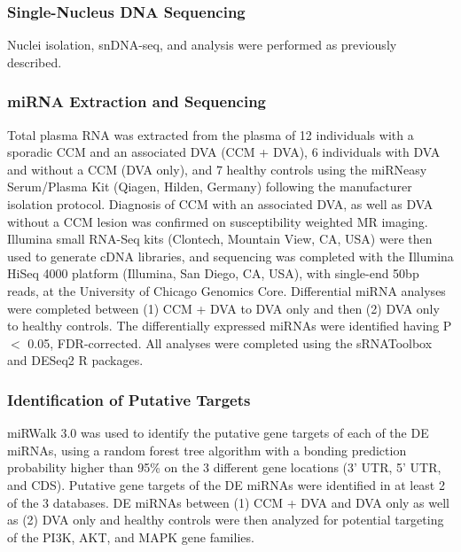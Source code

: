 \subsubsection{Single-Nucleus DNA Sequencing}
Nuclei isolation, snDNA-seq, and analysis were performed as previously described\citep{ren2021}. 

\subsubsection{miRNA Extraction and Sequencing}
Total plasma RNA was extracted from the plasma of 12 individuals with a sporadic CCM and an associated DVA (CCM + DVA), 6 individuals with DVA and without a CCM (DVA only), and 7 healthy controls using the miRNeasy Serum/Plasma Kit (Qiagen, Hilden, Germany) following the manufacturer isolation protocol. Diagnosis of CCM with an associated DVA, as well as DVA without a CCM lesion was confirmed on susceptibility weighted MR imaging. Illumina small RNA-Seq kits (Clontech, Mountain View, CA, USA) were then used to generate cDNA libraries, and sequencing was completed with the Illumina HiSeq 4000 platform (Illumina, San Diego, CA, USA), with single-end 50bp reads, at the University of Chicago Genomics Core. Differential miRNA analyses were completed between (1) CCM + DVA to DVA only and then (2) DVA only to healthy controls. The differentially expressed miRNAs were identified having P $<$ 0.05, FDR-corrected. All analyses were completed using the sRNAToolbox and DESeq2 R packages\citep{love2014, rueda2015}.

\subsubsection{Identification of Putative Targets}
miRWalk 3.0 was used to identify the putative gene targets of each of the DE miRNAs, using a random forest tree algorithm with a bonding prediction probability higher than 95\% on the 3 different gene locations (3' UTR, 5' UTR, and CDS)\citep{sticht2018}. Putative gene targets of the DE miRNAs were identified in at least 2 of the 3 databases. DE miRNAs between (1) CCM + DVA and DVA only as well as (2) DVA only and healthy controls were then analyzed for potential targeting of the PI3K, AKT, and MAPK gene families. 

